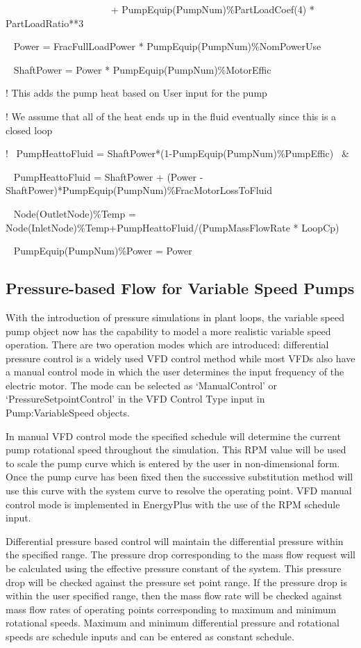 ~~~~~~~~~~~~~~~~~~~~~ + PumpEquip(PumpNum)\%PartLoadCoef(4) * PartLoadRatio**3

~ Power = FracFullLoadPower * PumpEquip(PumpNum)\%NomPowerUse

~ ShaftPower = Power * PumpEquip(PumpNum)\%MotorEffic

! This adds the pump heat based on User input for the pump

! We assume that all of the heat ends up in the fluid eventually since this is a closed loop

!~ PumpHeattoFluid = ShaftPower*(1-PumpEquip(PumpNum)\%PumpEffic)~ \&

~ PumpHeattoFluid = ShaftPower + (Power - ShaftPower)*PumpEquip(PumpNum)\%FracMotorLossToFluid

~ Node(OutletNode)\%Temp = Node(InletNode)\%Temp+PumpHeattoFluid/(PumpMassFlowRate * LoopCp)

~ PumpEquip(PumpNum)\%Power = Power

\subsection{Pressure-based Flow for Variable Speed Pumps}\label{pressure-based-flow-for-variable-speed-pumps}

With the introduction of pressure simulations in plant loops, the variable speed pump object now has the capability to model a more realistic variable speed operation. There are two operation modes which are introduced: differential pressure control is a widely used VFD control method while most VFDs also have a manual control mode in which the user determines the input frequency of the electric motor. The mode can be selected as `ManualControl' or `PressureSetpointControl' in the VFD Control Type input in Pump:VariableSpeed objects.

In manual VFD control mode the specified schedule will determine the current pump rotational speed throughout the simulation. This RPM value will be used to scale the pump curve which is entered by the user in non-dimensional form. Once the pump curve has been fixed then the successive substitution method will use this curve with the system curve to resolve the operating point. VFD manual control mode is implemented in EnergyPlus with the use of the RPM schedule input.

Differential pressure based control will maintain the differential pressure within the specified range. The pressure drop corresponding to the mass flow request will be calculated using the effective pressure constant of the system. This pressure drop will be checked against the pressure set point range. If the pressure drop is within the user specified range, then the mass flow rate will be checked against mass flow rates of operating points corresponding to maximum and minimum rotational speeds. Maximum and minimum differential pressure and rotational speeds are schedule inputs and can be entered as constant schedule.

